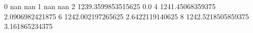 0 nan nan
1 nan nan
2 1239.3599853515625 0.0
4 1241.45068359375 2.0906982421875
6 1242.002197265625 2.6422119140625
8 1242.5218505859375 3.161865234375
